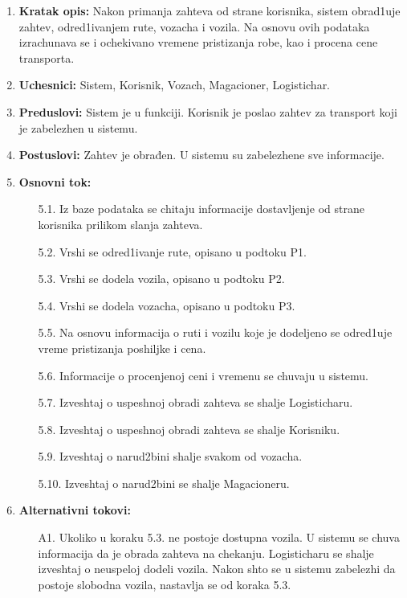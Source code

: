 
\begin{enumerate}
    \item \textbf{Kratak opis:} Nakon primanja zahteva od strane korisnika, sistem obrad1uje zahtev, odred1ivanjem rute, vozacha i vozila. Na osnovu ovih podataka izrachunava se i ochekivano vremene pristizanja robe, kao i procena cene transporta.
    
    \item \textbf{Uchesnici:} Sistem, Korisnik, Vozach, Magacioner, Logistichar.
    \item \textbf{Preduslovi:}  Sistem je u funkciji. Korisnik je poslao zahtev za transport koji je zabelezhen u sistemu.
    
    \item \textbf{Postuslovi:} Zahtev je obrađen. U sistemu su zabelezhene sve informacije.
    \item \textbf{Osnovni tok:}
        \begin{enumerate}
            \item[5.1.] Iz baze podataka se chitaju informacije dostavljenje od strane korisnika prilikom slanja zahteva.
            
            \item[5.2.] Vrshi se odred1ivanje rute, opisano u podtoku P1.
            \item[5.3.] Vrshi se dodela vozila, opisano u podtoku P2.
            \item[5.4.] Vrshi se dodela vozacha, opisano u podtoku P3.
            \item[5.5.] Na osnovu informacija o ruti i vozilu koje je dodeljeno se odred1uje vreme pristizanja poshiljke i cena.
            \item [5.6.] Informacije o procenjenoj ceni i vremenu se chuvaju u sistemu.
            \item [5.7.] Izveshtaj o uspeshnoj obradi zahteva se shalje Logisticharu.
            \item [5.8.] Izveshtaj o uspeshnoj obradi zahteva se shalje Korisniku.
            \item [5.9.] Izveshtaj o narud2bini shalje svakom od vozacha.
            \item [5.10.] Izveshtaj o narud2bini se shalje Magacioneru.
        \end{enumerate}
    \item \textbf{Alternativni tokovi:}
            \begin{itemize}
            
            \item [A1.] Ukoliko u koraku 5.3. ne postoje dostupna vozila. 
            U sistemu se chuva informacija da je obrada zahteva na chekanju. Logisticharu se shalje izveshtaj o neuspeloj dodeli vozila. Nakon shto se u sistemu zabelezhi da postoje slobodna vozila, nastavlja se od koraka 5.3.
            

\end{itemize}
\end{enumerate}
